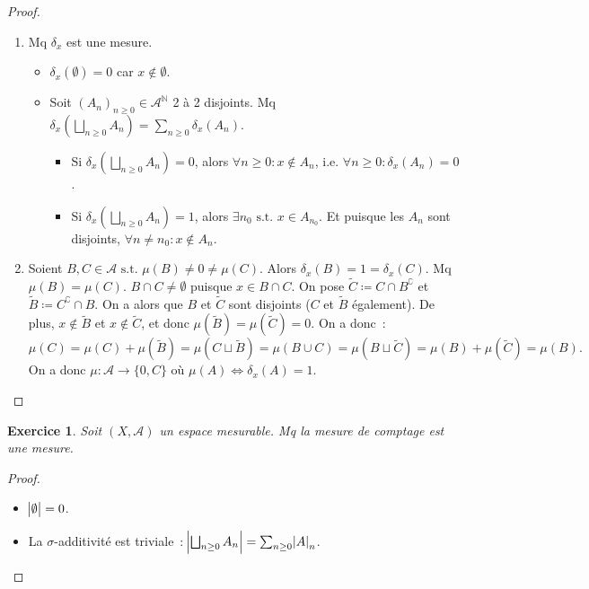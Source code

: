 \documentclass{article}
\newtheorem{ex}{Exercice}[section]
\theoremstyle{definition}
\newcommand{\st}{\text{ s.t. }}
\newcommand{\C}{\complement}
\newcommand{\N}{{\mathbb N}}
\begin{document}
\begin{proof}~
\begin{enumerate}
	\item Mq $\delta_x$ est une mesure.
	\begin{itemize}
		\item $\delta_x(\emptyset) = 0$ car $x \not \in \emptyset$.
		\item Soit $(A_n)_{n \geq 0} \in \mathcal A^\N$ 2 à 2 disjoints. Mq $\delta_x(\bigsqcup_{n \geq 0}A_n) = \sum_{n \geq 0}\delta_x(A_n)$.
		\begin{itemize}
			\item Si $\delta_x(\bigsqcup_{n \geq 0}A_n) = 0$, alors $\forall n \geq 0 : x \not \in A_n$, i.e. $\forall n \geq 0 : \delta_x(A_n) = 0$.
			\item Si $\delta_x(\bigsqcup_{n \geq 0}A_n) = 1$, alors $\exists n_0 \st x \in A_{n_0}$. Et puisque les $A_n$ sont disjoints, $\forall n \neq n_0 : x \not \in A_n$.
		\end{itemize}
	\end{itemize}
	\item Soient $B, C \in \mathcal A \st \mu(B) \neq 0 \neq \mu(C)$. Alors $\delta_x(B) = 1 = \delta_x(C)$. Mq $\mu(B) = \mu(C)$. $B \cap C \neq \emptyset$ puisque $x \in B \cap C$.
	On pose $\tilde C \coloneqq C \cap B^\C$ et $\tilde B \coloneqq C^\C \cap B$. On a alors que $B$ et $\tilde C$ sont disjoints ($C$ et $\tilde B$ également).
	De plus, $x \not \in \tilde B$ et $x \not \in \tilde C$, et donc $\mu(\tilde B) = \mu(\tilde C) = 0$. On a donc~:
	\[\mu(C) = \mu(C) + \mu(\tilde B) = \mu(C \sqcup \tilde B) = \mu(B \cup C) = \mu(B \sqcup \tilde C) = \mu(B) + \mu(\tilde C) = \mu(B).\]
	On a donc $\mu : \mathcal A \to \{0, C\}$ où $\mu(A) \iff \delta_x(A) = 1$.
\end{enumerate}
\end{proof}

\begin{ex} Soit $(X, \mathcal A)$ un espace mesurable. Mq la mesure de comptage est une mesure.
\end{ex}

\begin{proof}~
\begin{itemize}
	\item $\abs \emptyset = 0$.
	\item La $\sigma$-additivité est triviale~: $\abs {\bigsqcup_{n \geq 0}A_n} = \sum_{n \geq 0}\abs A_n$.
\end{itemize}
\end{proof}
\end{document}
